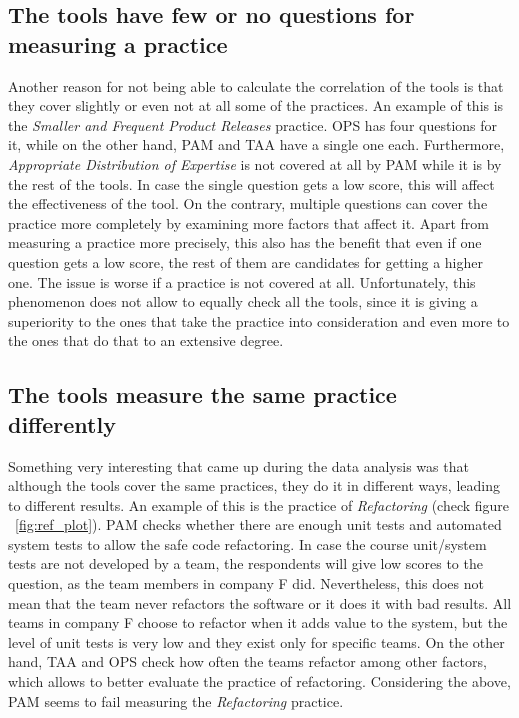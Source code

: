 \subsection{The tools have few or no questions for measuring a practice}
Another reason for not being able to calculate the correlation of the tools is that they cover slightly or even not at all some of the practices. An example of this is the \textit{Smaller and Frequent Product Releases} practice. \ac{OPS} has four questions for it, while on the other hand, \ac{PAM} and \ac{TAA} have a single one each. Furthermore, \textit{Appropriate Distribution of Expertise} is not covered at all by \ac{PAM} while it is by the rest of the tools. In case the single question gets a low score, this will affect the effectiveness of the tool. On the contrary, multiple questions can cover the practice more completely by examining more factors that affect it. Apart from measuring a practice more precisely, this also has the benefit that even if one question gets a low score, the rest of them are candidates for getting a higher one. The issue is worse if a practice is not covered at all. Unfortunately, this phenomenon does not allow to equally check all the tools, since it is giving a superiority to the ones that take the practice into consideration and even more to the ones that do that to an extensive degree.

\subsection{The tools measure the same practice differently}
Something very interesting that came up during the data analysis was that although the tools cover the same practices, they do it in different ways, leading to different results. An example of this is the practice of \textit{Refactoring} (check figure ~\ref{fig:ref_plot}). \ac{PAM} checks whether there are enough unit tests and automated system tests to allow the safe code refactoring. In case the course unit/system tests are not developed by a team, the respondents will give low scores to the question, as the team members in company F did. Nevertheless, this does not mean that the team never refactors the software or it does it with bad results. All teams in company F choose to refactor when it adds value to the system, but the level of unit tests is very low and they exist only for specific teams. On the other hand, \ac{TAA} and \ac{OPS} check how often the teams refactor among other factors, which allows to better evaluate the practice of refactoring. Considering the above, \ac{PAM} seems to fail measuring the \textit{Refactoring} practice.

